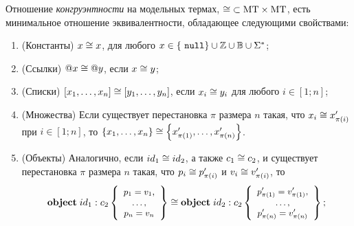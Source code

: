 \begin{Def}
Отношение \emph{конгруэнтности} на модельных термах, \mbox{$\cong \;\subset \mbox{MT} \times \mbox{MT}$}, есть минимальное отношение эквивалентности, обладающее следующими свойствами:
\begin{enumerate}
\item (Константы) \mbox{$x \cong x$}, для любого $x \in \left\{\ \mathtt{null} \right\} \cup \mathbb{Z} \cup \mathbb{B} \cup \Sigma^*$;
\item (Ссылки) $@x \cong @y$, если $x \cong y$;
\item (Списки) $\left[x_1, \ldots, x_n\right] \cong \left[y_1, \ldots, y_n\right]$, если $x_i \cong y_i$ для любого $i \in [1; n]$;
\item (Множества) Если существует перестановка $\pi$ размера $n$ такая, что \mbox{$x_i \cong x'_{\pi(i)}$} при \mbox{$i \in [1;n]$}, то $\left\{x_1, \ldots, x_n\right\} \cong \left\{x'_{\pi(1)}, \ldots, x'_{\pi(n)}\right\}$.
\item (Объекты) Аналогично, если $id_1 \cong id_2$, а также $c_1 \cong c_2$, и существует перестановка $\pi$ размера $n$ такая, что $p_i \cong p'_{\pi(i)}$ и $v_i \cong v'_{\pi(i)}$, то 
$$ 
\mathbf{object}\;id_1 : c_2\left\{ 
	\mbox{\small$\begin{array}{c}
		p_1=v_1,\\ 
		\ldots,\\ 
		p_n=v_n
	\end{array}$}
 \right\} \cong \mathbf{object}\;id_2 : c_2\left\{ 
	\mbox{\small$\begin{array}{c}
		p'_{\pi(1)}=v'_{\pi(1)},\\
		\ldots,\\
		p'_{\pi(n)}=v'_{\pi(n)}	
	\end{array}$}
 \right\};
$$
\end{enumerate}
\end{Def}

